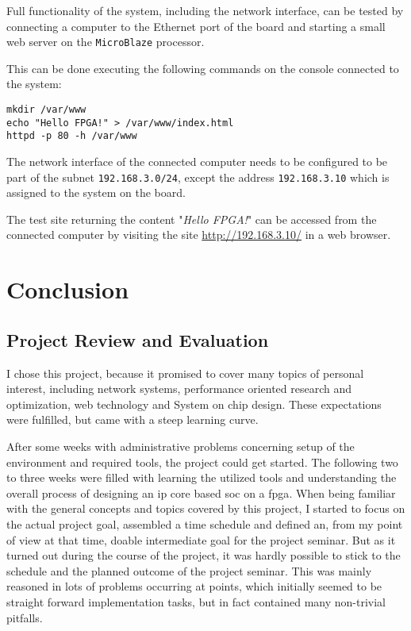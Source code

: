 Full functionality of the system, including the network interface, can be tested by connecting a computer to the Ethernet port of the board and starting a small web server on the \texttt{MicroBlaze} processor.

This can be done executing the following commands on the console connected to the system:

\begin{verbatim}
mkdir /var/www
echo "Hello FPGA!" > /var/www/index.html
httpd -p 80 -h /var/www
\end{verbatim}

The network interface of the connected computer needs to be configured to be part of the subnet \texttt{192.168.3.0/24}, except the address \texttt{192.168.3.10} which is assigned to the system on the board.

The test site returning the content "\textit{Hello FPGA!}" can be accessed from the connected computer by visiting the site \url{http://192.168.3.10/} in a web browser.

\chapter{Conclusion}

\section{Project Review and Evaluation}

I chose this project, because it promised to cover many topics of personal interest, including network systems, performance oriented research and optimization, web technology and System on chip design. These expectations were fulfilled, but came with a steep learning curve.

After some weeks with administrative problems concerning setup of the environment and required tools, the project could get started. The following two to three weeks were filled with learning the utilized tools and understanding the overall process of designing an \gls{ip} core based \gls{soc} on a \gls{fpga}. When being familiar with the general concepts and topics covered by this project, I started to focus on the actual project goal, assembled a time schedule and defined an, from my point of view at that time, doable intermediate goal for the project seminar. But as it turned out during the course of the project, it was hardly possible to stick to the schedule and the planned outcome of the project seminar. This was mainly reasoned in lots of problems occurring at points, which initially seemed to be straight forward implementation tasks, but in fact contained many non-trivial pitfalls. 

